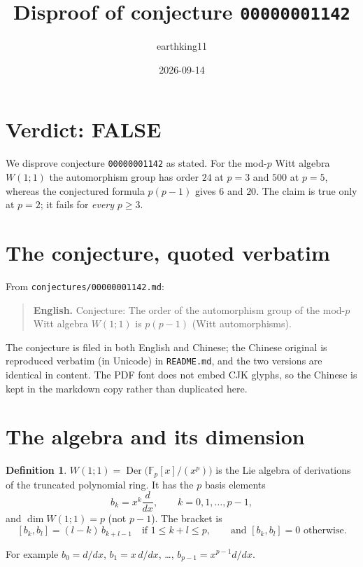 \documentclass[11pt]{article}
\title{Disproof of conjecture \texttt{00000001142}}
\author{earthking11}
\date{2026-09-14}
\theoremstyle{definition}
\newtheorem{definition}[theorem]{Definition}
\theoremstyle{remark}
\newcommand{\Fp}{\mathbb{F}_p}
\newcommand{\Der}{\operatorname{Der}}
\begin{document}
\maketitle

\section*{Verdict: FALSE}

We disprove conjecture \texttt{00000001142} as stated. For the mod-$p$ Witt
algebra $W(1;1)$ the automorphism group has order $24$ at $p=3$ and $500$ at
$p=5$, whereas the conjectured formula $p(p-1)$ gives $6$ and $20$. The claim
is true only at $p=2$; it fails for \emph{every} $p\ge 3$.

\section{The conjecture, quoted verbatim}

From \texttt{conjectures/00000001142.md}:

\begin{quote}
\textbf{English.} Conjecture: The order of the automorphism group of the
mod-$p$ Witt algebra $W(1;1)$ is $p(p-1)$ (Witt automorphisms).
\end{quote}

The conjecture is filed in both English and Chinese; the Chinese original is
reproduced verbatim (in Unicode) in \texttt{README.md}, and the two versions
are identical in content. The PDF font does not embed CJK glyphs, so the
Chinese is kept in the markdown copy rather than duplicated here.

\section{The algebra and its dimension}

\begin{definition}
$W(1;1)=\Der\bigl(\Fp[x]/(x^p)\bigr)$ is the Lie algebra of derivations of the
truncated polynomial ring. It has the $p$ basis elements
\[
b_k = x^k \frac{d}{dx}, \qquad k = 0, 1, \dots, p-1,
\]
and $\dim W(1;1) = p$ (not $p-1$). The bracket is
\begin{equation}\label{eq:bracket}
[b_k,b_l] = (l-k)\, b_{k+l-1}\quad \text{if } 1 \le k+l \le p,
\qquad\text{and } [b_k,b_l]=0 \text{ otherwise}.
\end{equation}
\end{definition}

For example $b_0 = d/dx$, $b_1 = x\,d/dx$, \dots, $b_{p-1}=x^{p-1}d/dx$.
\end{document}
